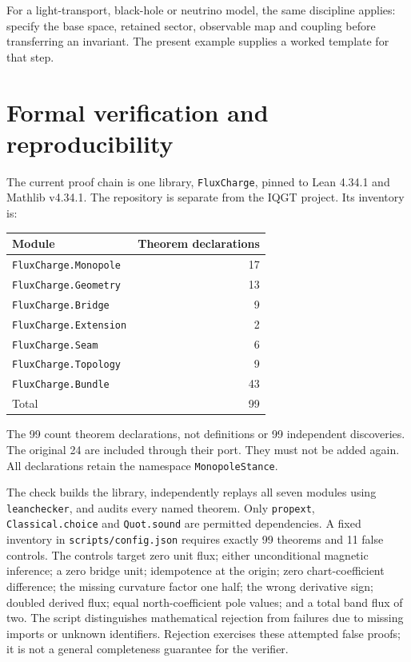 \documentclass[11pt]{article}
\theoremstyle{definition}\newtheorem{definition}[theorem]{Definition}
\theoremstyle{remark}\newtheorem{remark}[theorem]{Remark}
\begin{document}
For a light-transport, black-hole or neutrino model, the same discipline applies: specify the base space, retained sector, observable map and coupling before transferring an invariant. The present example supplies a worked template for that step.

\section{Formal verification and reproducibility}\label{sec:formal}
The current proof chain is one library, \texttt{FluxCharge}, pinned to Lean 4.34.1 and Mathlib v4.34.1. The repository is separate from the IQGT project. Its inventory is:
\begin{center}
\begin{tabular}{lr}
\toprule Module & Theorem declarations\\\midrule
\texttt{FluxCharge.Monopole} & 17\\
\texttt{FluxCharge.Geometry} & 13\\
\texttt{FluxCharge.Bridge} & 9\\
\texttt{FluxCharge.Extension} & 2\\
\texttt{FluxCharge.Seam} & 6\\
\texttt{FluxCharge.Topology} & 9\\
\texttt{FluxCharge.Bundle} & 43\\\midrule
Total & 99\\\bottomrule
\end{tabular}
\end{center}
The 99 count theorem declarations, not definitions or 99 independent discoveries. The original 24 are included through their port. They must not be added again. All declarations retain the namespace \texttt{MonopoleStance}.

The check builds the library, independently replays all seven modules using \texttt{leanchecker}, and audits every named theorem. Only \texttt{propext}, \texttt{Classical.choice} and \texttt{Quot.sound} are permitted dependencies. A fixed inventory in \texttt{scripts/config.json} requires exactly 99 theorems and 11 false controls. The controls target zero unit flux; either unconditional magnetic inference; a zero bridge unit; idempotence at the origin; zero chart-coefficient difference; the missing curvature factor one half; the wrong derivative sign; doubled derived flux; equal north-coefficient pole values; and a total band flux of two. The script distinguishes mathematical rejection from failures due to missing imports or unknown identifiers. Rejection exercises these attempted false proofs; it is not a general completeness guarantee for the verifier.
\end{document}
